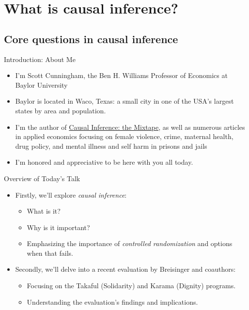 \documentclass{beamer}
\begin{document}




\section{What is causal inference?}



\subsection{Core questions in causal inference}


\begin{frame}{Introduction: About Me}
\begin{itemize}
\item I'm Scott Cunningham, the Ben H. Williams Professor of Economics at Baylor University
\item Baylor is located in Waco, Texas: a small city in one of the USA's largest states by area and population.
\item I'm the author of \underline{Causal Inference: the Mixtape}, as well as numerous articles in applied economics focusing on female violence, crime, maternal health, drug policy, and mental illness and self harm in prisons and jails
\item I'm honored and appreciative to be here with you all today.
\end{itemize}
\end{frame}

\begin{frame}{Overview of Today's Talk}
\begin{itemize}
\item Firstly, we'll explore \emph{causal inference}: 
    \begin{itemize}
    \item What is it?
    \item Why is it important?
    \item Emphasizing the importance of \emph{controlled randomization} and options when that fails.
    \end{itemize}
\item Secondly, we'll delve into a recent evaluation by Breisinger and coauthors:
    \begin{itemize}
    \item Focusing on the Takaful (Solidarity) and Karama (Dignity) programs.
    \item Understanding the evaluation's findings and implications.
    \end{itemize}
\end{itemize}
\end{frame}
\end{document}

